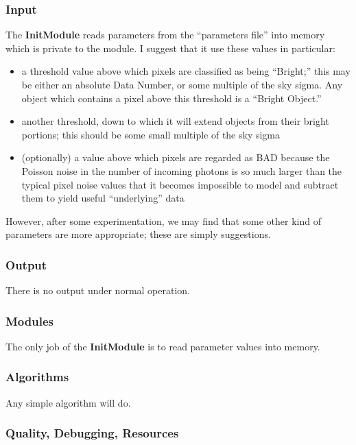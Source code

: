 \subsubsection {Input}

  The {\bf InitModule} reads parameters from the ``parameters file''
into memory which is private to the \bom module.  I suggest that it
use these values in particular:

\begin{itemize} 
  \item a threshold value above which pixels are classified as being
        ``Bright;''  this may be either an absolute Data Number,
        or some multiple of the sky sigma.  Any object which contains
        a pixel above this threshold is a ``Bright Object.''
  \item another threshold, down to which it will extend objects from their
        bright portions;  this should be some small multiple of the sky
        sigma
  \item (optionally) a value above which pixels are regarded as BAD
        because the Poisson noise in the number of incoming photons is
        so much larger than the typical pixel noise values that it
        becomes impossible to model and subtract them to yield useful
        ``underlying'' data
\end{itemize}

  However, after some experimentation, we may find that some other
kind of parameters are more appropriate; these are simply suggestions.

\subsubsection {Output}

  There is no output under normal operation.

\subsubsection {Modules}

  The only job of the {\bf InitModule} is to read parameter values 
into memory.

\subsubsection {Algorithms}

  Any simple algorithm will do.

\subsubsection {Quality, Debugging, Resources}

